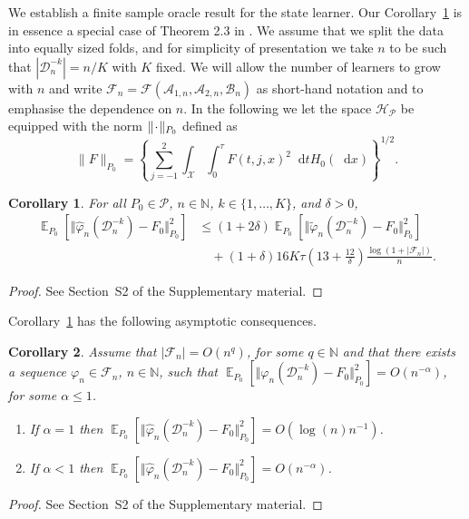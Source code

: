 \documentclass[11pt]{article}
\theoremstyle{thmstyleone}%
\newtheorem{corollary}{Corollary}
\theoremstyle{thmstyletwo}%
\theoremstyle{thmstylethree}%
\DeclareMathOperator{\E}{\mathbb{E}} %
\newcommand{\N}{\mathbb{N}}
\newcommand{\blank}{\makebox[1ex]{\textbf{$\cdot$}}}
\renewcommand{\phi}{\varphi}
\newcommand*\diff{\mathop{}\!\mathrm{d}}
\newcommand\bigO{\textit{O}}
\newcommand{\1}{\mathds{1}}
\newcommand{\data}{\ensuremath{\mathcal{D}}}
\begin{document}
We establish a finite sample oracle result for the state learner. Our
Corollary~\ref{cor:oracle-prop} is in essence a special case of
Theorem 2.3 in \citep{vaart2006oracle}.  We assume that we split the
data into equally sized folds, and for simplicity of presentation we
take \( n \) to be such that \( |\data_n^{-k}| = n/K \) with \( K \)
fixed. We will allow the number of learners to grow with \( n \) and
write
\( \mathcal{F}_n=\mathcal{F}(\mathcal{A}_{1,n}, \mathcal{A}_{2,n},
\mathcal{B}_n)\) as short-hand notation and to emphasise the
dependence on \( n \).
In the following we let the space \( \mathcal{H}_{\mathcal{P}} \) be equipped with the norm
\( \| \blank \|_{P_0} \) defined as
\begin{equation}
  \label{eq:norm}
  \| F \|_{P_0} = 
  \left\{
    \sum_{j=-1}^{2}\int_{\mathcal{X}} \int_0^{\tau} F(t, j, x)^2 \diff t H_0( \diff x)
  \right\}^{1/2}.
\end{equation}

\begin{corollary}
  \label{cor:oracle-prop}
  For all \(P_0\in\mathcal{P}\), \( n \in \N \), \( k \in \{1, \dots, K\} \),
  and $\delta>0$,
  \begin{align*}
    \E_{P_0}{\left[ \Vert \hat{\phi}_n(\data_n^{-k}) - F_0 \Vert_{P_0}^2 \right]}
    & \leq (1 + 2\delta)
      \E_{P_0}{\left[ \Vert \tilde{\phi}_n(\data_n^{-k}) - F_0 \Vert_{P_0}^2 \right]}
    \\
    & \quad
      + (1+ \delta) 16   K \tau
      \left(
      13 + \frac{12}{\delta}
      \right)
      \frac{\log(1 + |\mathcal{F}_n|)}{n}.
  \end{align*}
\end{corollary}
\begin{proof}
  See Section~S2 of the Supplementary material.
\end{proof}

Corollary~\ref{cor:oracle-prop} has the following asymptotic consequences.

\begin{corollary}
  \label{cor:asymp-cons}
  Assume that \( |\mathcal{F}_n| = \bigO(n^q)\), for some \( q \in \N \) and
  that there exists a sequence \( \phi_n \in \mathcal{F}_n \), \( n \in \N \),
  such that
  \( \E_{P_0}{\left[ \Vert \phi_n(\data_n^{-k}) - F_{0} \Vert_{P_0}^2 \right]} =
  \bigO(n^{-\alpha}) \), for some \( \alpha\leq 1 \).
  \begin{enumerate}[label=(\alph*)]
  \item If $\alpha=1$ then
    \( \E_{P_0}{\left[ \Vert \hat{\phi}_n(\data_n^{-k}) - F_0 \Vert_{P_0}^2
      \right]} = \bigO(\log(n)n^{-1}) \).
  \item If $\alpha<1$ then
    \( \E_{P_0}{\left[ \Vert \hat{\phi}_n(\data_n^{-k}) - F_0 \Vert_{P_0}^2 \right]} =
    \bigO(n^{-\alpha}) \).
  \end{enumerate}
\end{corollary}
\begin{proof}
  See Section~S2 of the Supplementary material.
\end{proof}
\end{document}
